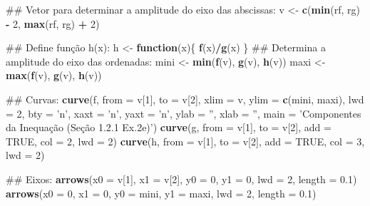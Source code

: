 \documentclass[]{book}
\newenvironment{Shaded}{\begin{snugshade}}{\end{snugshade}}
\newcommand{\KeywordTok}[1]{\textcolor[rgb]{0.13,0.29,0.53}{\textbf{#1}}}
\newcommand{\DataTypeTok}[1]{\textcolor[rgb]{0.13,0.29,0.53}{#1}}
\newcommand{\DecValTok}[1]{\textcolor[rgb]{0.00,0.00,0.81}{#1}}
\newcommand{\FloatTok}[1]{\textcolor[rgb]{0.00,0.00,0.81}{#1}}
\newcommand{\StringTok}[1]{\textcolor[rgb]{0.31,0.60,0.02}{#1}}
\newcommand{\OtherTok}[1]{\textcolor[rgb]{0.56,0.35,0.01}{#1}}
\newcommand{\ControlFlowTok}[1]{\textcolor[rgb]{0.13,0.29,0.53}{\textbf{#1}}}
\newcommand{\OperatorTok}[1]{\textcolor[rgb]{0.81,0.36,0.00}{\textbf{#1}}}
\newcommand{\NormalTok}[1]{#1}
\begin{document}
\begin{enumerate}
\begin{Shaded}
\begin{Highlighting}[]
\NormalTok{##  Vetor para determinar a amplitude do eixo das abscissas:}
\NormalTok{v <-}\StringTok{ }\KeywordTok{c}\NormalTok{(}\KeywordTok{min}\NormalTok{(rf, rg) }\OperatorTok{-}\StringTok{ }\DecValTok{2}\NormalTok{, }\KeywordTok{max}\NormalTok{(rf, rg) }\OperatorTok{+}\StringTok{ }\DecValTok{2}\NormalTok{)}

\NormalTok{##  Define função h(x):}
\NormalTok{h <-}\StringTok{ }\ControlFlowTok{function}\NormalTok{(x)\{}
  \KeywordTok{f}\NormalTok{(x)}\OperatorTok{/}\KeywordTok{g}\NormalTok{(x)}
\NormalTok{\}}
\NormalTok{##  Determina  a amplitude do eixo das ordenadas:}
\NormalTok{mini <-}\StringTok{ }\KeywordTok{min}\NormalTok{(}\KeywordTok{f}\NormalTok{(v), }\KeywordTok{g}\NormalTok{(v), }\KeywordTok{h}\NormalTok{(v))}
\NormalTok{maxi <-}\StringTok{ }\KeywordTok{max}\NormalTok{(}\KeywordTok{f}\NormalTok{(v), }\KeywordTok{g}\NormalTok{(v), }\KeywordTok{h}\NormalTok{(v))}

\NormalTok{##  Curvas:}
\KeywordTok{curve}\NormalTok{(f, }\DataTypeTok{from =}\NormalTok{ v[}\DecValTok{1}\NormalTok{], }\DataTypeTok{to =}\NormalTok{ v[}\DecValTok{2}\NormalTok{], }\DataTypeTok{xlim =}\NormalTok{ v, }\DataTypeTok{ylim =} \KeywordTok{c}\NormalTok{(mini, maxi), }\DataTypeTok{lwd =} \DecValTok{2}\NormalTok{,}
  \DataTypeTok{bty =} \StringTok{'n'}\NormalTok{, }\DataTypeTok{xaxt =} \StringTok{'n'}\NormalTok{, }\DataTypeTok{yaxt =} \StringTok{'n'}\NormalTok{, }\DataTypeTok{ylab =} \StringTok{''}\NormalTok{, }\DataTypeTok{xlab =} \StringTok{''}\NormalTok{,}
  \DataTypeTok{main =} \StringTok{'Componentes da Inequação (Seção 1.2.1 Ex.2e)'}\NormalTok{)}
\KeywordTok{curve}\NormalTok{(g, }\DataTypeTok{from =}\NormalTok{ v[}\DecValTok{1}\NormalTok{], }\DataTypeTok{to =}\NormalTok{ v[}\DecValTok{2}\NormalTok{], }\DataTypeTok{add =} \OtherTok{TRUE}\NormalTok{, }\DataTypeTok{col =} \DecValTok{2}\NormalTok{, }\DataTypeTok{lwd =} \DecValTok{2}\NormalTok{)}
\KeywordTok{curve}\NormalTok{(h, }\DataTypeTok{from =}\NormalTok{ v[}\DecValTok{1}\NormalTok{], }\DataTypeTok{to =}\NormalTok{ v[}\DecValTok{2}\NormalTok{], }\DataTypeTok{add =} \OtherTok{TRUE}\NormalTok{, }\DataTypeTok{col =} \DecValTok{3}\NormalTok{, }\DataTypeTok{lwd =} \DecValTok{2}\NormalTok{)}

\NormalTok{##  Eixos:}
\KeywordTok{arrows}\NormalTok{(}\DataTypeTok{x0 =}\NormalTok{ v[}\DecValTok{1}\NormalTok{], }\DataTypeTok{x1 =}\NormalTok{ v[}\DecValTok{2}\NormalTok{],}
   \DataTypeTok{y0 =} \DecValTok{0}\NormalTok{, }\DataTypeTok{y1 =} \DecValTok{0}\NormalTok{, }\DataTypeTok{lwd =} \DecValTok{2}\NormalTok{, }\DataTypeTok{length =} \FloatTok{0.1}\NormalTok{)}
\KeywordTok{arrows}\NormalTok{(}\DataTypeTok{x0 =} \DecValTok{0}\NormalTok{, }\DataTypeTok{x1 =} \DecValTok{0}\NormalTok{,}
   \DataTypeTok{y0 =}\NormalTok{ mini, }\DataTypeTok{y1 =}\NormalTok{ maxi, }\DataTypeTok{lwd =} \DecValTok{2}\NormalTok{, }\DataTypeTok{length =} \FloatTok{0.1}\NormalTok{)}


\end{Highlighting}
\end{Shaded}
\end{enumerate}
\end{document}
